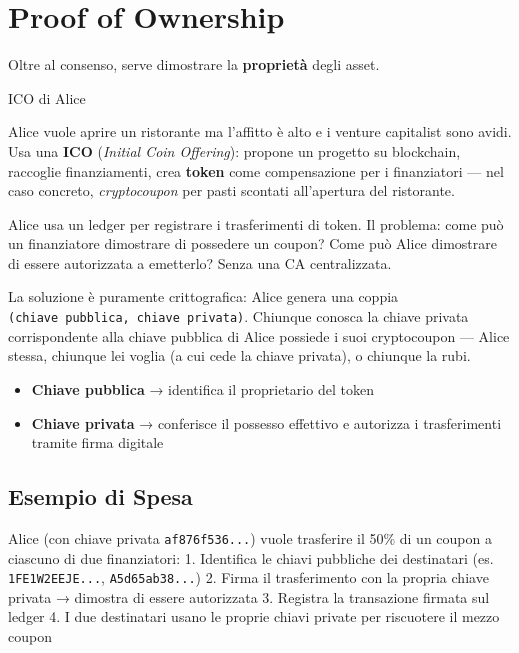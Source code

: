 \documentclass[
  italian,
  openany]{book}
\providecommand{\tightlist}{%
  \setlength{\itemsep}{0pt}\setlength{\parskip}{0pt}}
\begin{document}
\section{Proof of Ownership}\label{proof-of-ownership}

Oltre al consenso, serve dimostrare la \textbf{proprietà} degli asset.

\begin{callouttip}{ICO di Alice}

Alice vuole aprire un ristorante ma l'affitto è alto e i venture
capitalist sono avidi. Usa una \textbf{ICO} (\emph{Initial Coin
Offering}): propone un progetto su blockchain, raccoglie finanziamenti,
crea \textbf{token} come compensazione per i finanziatori --- nel caso
concreto, \emph{cryptocoupon} per pasti scontati all'apertura del
ristorante.

Alice usa un ledger per registrare i trasferimenti di token. Il
problema: come può un finanziatore dimostrare di possedere un coupon?
Come può Alice dimostrare di essere autorizzata a emetterlo? Senza una
CA centralizzata.

\end{callouttip}

La soluzione è puramente crittografica: Alice genera una coppia
\texttt{(chiave\ pubblica,\ chiave\ privata)}. Chiunque conosca la
chiave privata corrispondente alla chiave pubblica di Alice possiede i
suoi cryptocoupon --- Alice stessa, chiunque lei voglia (a cui cede la
chiave privata), o chiunque la rubi.

\begin{itemize}
\tightlist
\item
  \textbf{Chiave pubblica} → identifica il proprietario del token
\item
  \textbf{Chiave privata} → conferisce il possesso effettivo e autorizza
  i trasferimenti tramite firma digitale
\end{itemize}

\subsection{Esempio di Spesa}\label{esempio-di-spesa}

Alice (con chiave privata \texttt{af876f536...}) vuole trasferire il
50\% di un coupon a ciascuno di due finanziatori: 1. Identifica le
chiavi pubbliche dei destinatari (es. \texttt{1FE1W2EEJE...},
\texttt{A5d65ab38...}) 2. Firma il trasferimento con la propria chiave
privata → dimostra di essere autorizzata 3. Registra la transazione
firmata sul ledger 4. I due destinatari usano le proprie chiavi private
per riscuotere il mezzo coupon
\end{document}
